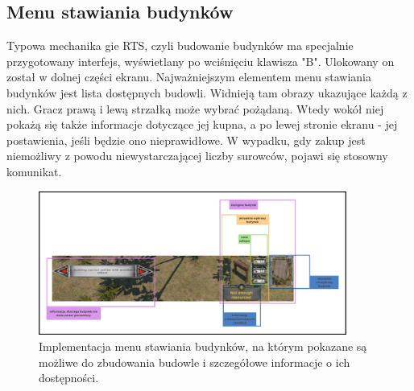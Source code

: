 \subsection{Menu stawiania budynków}
Typowa mechanika gie RTS, czyli budowanie budynków ma specjalnie przygotowany interfejs, wyświetlany po wciśnięciu klawisza "B". 
Ulokowany on został w dolnej części ekranu. Najważniejszym elementem menu stawiania budynków jest lista dostępnych budowli. Widnieją tam 
obrazy ukazujące każdą z nich. Gracz prawą i lewą strzałką może wybrać pożądaną. Wtedy wokół niej pokażą się także informacje dotyczące jej kupna,
a po lewej stronie ekranu - jej postawienia, jeśli będzie ono nieprawidłowe. W wypadku, gdy zakup jest niemożliwy z powodu niewystarczającej liczby 
surowców, pojawi się stosowny komunikat.
\begin{figure}[htbp]
    \centering
    \includegraphics[width=0.9\textwidth]{images/ui/opis_ekementow_budowanie.png}
    \caption{Implementacja menu stawiania budynków, na którym pokazane są możliwe do zbudowania budowle 
    i szczegółowe informacje o ich dostępności.
    }\label{fig:compass}
\end{figure}

